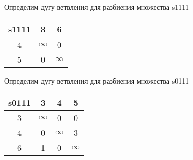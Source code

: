 \documentclass[a4paper,10pt]{report} %
\begin{document}
\newpage


Определим дугу ветвления для разбиения множества  s1111\\
\begin{flushleft}\begin{tabular}[]{|c|c|c|}
\hline
s1111 & 3 & 6\\
\hline
4 & $\infty$ &      0\\
\hline
5 &      0 & $\infty$\\
\hline
\end{tabular}
\end{flushleft}



\newpage


Определим дугу ветвления для разбиения множества  s0111\\
\begin{flushleft}\begin{tabular}[]{|c|c|c|c|}
\hline
s0111 & 3 & 4 & 5\\
\hline
3 & $\infty$ &      0 &      0\\
\hline
4 &      0 & $\infty$ &      3\\
\hline
6 &      1 &      0 & $\infty$\\
\hline
\end{tabular}
\end{flushleft}


\begin{table}[ht]
\hfill
{}
\end{table}
\end{document}
